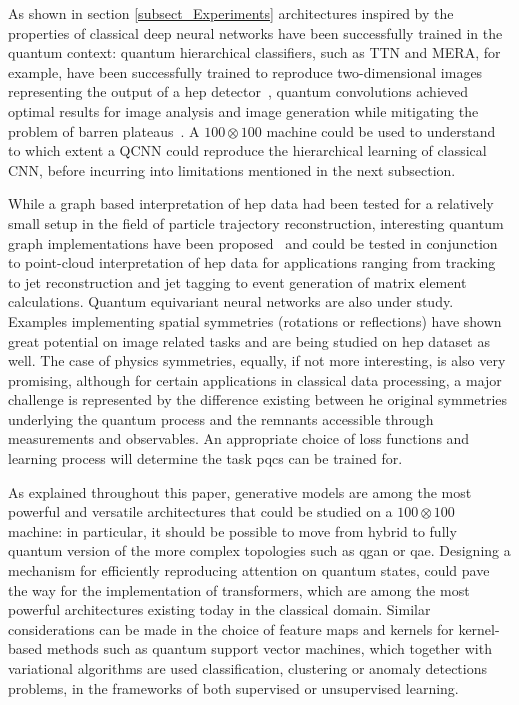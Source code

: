 As shown in section \ref{subsect_Experiments} architectures inspired by the properties of classical deep neural networks have been successfully trained in the quantum context: quantum hierarchical classifiers, such as TTN and MERA, for example,  have been successfully trained to reproduce two-dimensional images representing the output of a \gls{hep} detector~\cite{rehm2023full, borras2023impact,chang2021dual}, quantum convolutions achieved optimal results for image analysis and image generation while mitigating the problem of barren plateaus~\cite{chang2022quantum}. A $100 \otimes 100$ machine could be used to understand to which extent a QCNN could reproduce the hierarchical learning of classical CNN, before incurring into limitations mentioned in the next subsection.

While a graph based interpretation of \gls{hep} data had been tested for a relatively small setup in the field of particle trajectory reconstruction, interesting quantum graph implementations have been proposed~\cite{mernyei2022equivariant} and could be tested in conjunction to point-cloud interpretation of \gls{hep} data for applications ranging from tracking to jet reconstruction and jet tagging to event generation of matrix element calculations. 
Quantum equivariant neural networks are also under study. Examples implementing spatial symmetries (rotations or reflections) have shown great potential on image related tasks and are being studied on \gls{hep} dataset as well. The case of physics symmetries, equally, if not more interesting, is also very promising, although for certain applications in classical data processing, a major challenge is represented by the difference existing between he original symmetries underlying the quantum process and the remnants accessible through measurements and observables.
An appropriate choice of loss functions and learning process will determine the task \gls{pqc}s can be trained for.

As explained throughout this paper, generative models are among the most powerful and versatile architectures that could be studied on a $100 \otimes 100$ machine: in particular, it should be possible to move from hybrid to fully quantum version of the more complex topologies such as \gls{qgan} or \gls{qae}. Designing a mechanism for efficiently reproducing attention on quantum states, could pave the way for the implementation of transformers, which are among the most powerful architectures existing today in the classical domain.
Similar considerations can be made in the choice of feature maps and kernels for kernel-based methods such as quantum support vector machines, which together with variational algorithms are used classification, clustering or anomaly detections problems, in the frameworks of both supervised or unsupervised learning.


